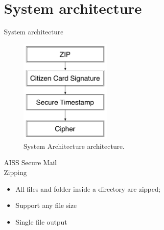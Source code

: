 \section{System architecture}

\begin{frame}{System architecture}
\vspace{-0.9cm}
\begin{figure}
	\centering
	\includegraphics[width=0.4\textwidth]{./images/architecture.pdf}	
 	\caption{System Architecture architecture.}
	\label{fig:}
\end{figure}

\end{frame}


\begin{frame}{AISS Secure Mail \\ \small Zipping}

\begin{itemize}
\item All files and folder inside a directory are zipped;
\item Support any file size
\item Single file output
\end{itemize}		
\end{frame}


